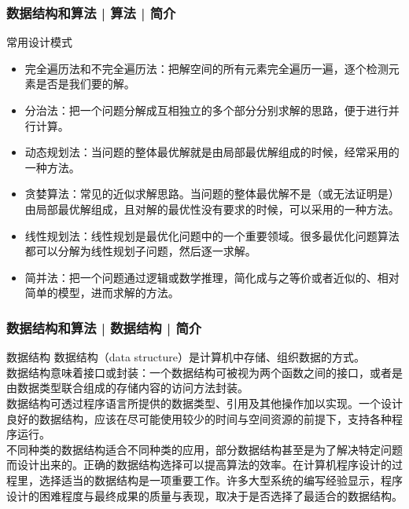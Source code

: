 \begin{frame}
  \frametitle{数据结构和算法 | 算法 | 简介}
  \begin{block}{常用设计模式}
    \begin{itemize}
      \item 完全遍历法和不完全遍历法：把解空间的所有元素完全遍历一遍，逐个检测元素是否是我们要的解。
      \item 分治法：把一个问题分解成互相独立的多个部分分别求解的思路，便于进行并行计算。
      \item 动态规划法：当问题的整体最优解就是由局部最优解组成的时候，经常采用的一种方法。
      \item 贪婪算法：常见的近似求解思路。当问题的整体最优解不是（或无法证明是）由局部最优解组成，且对解的最优性没有要求的时候，可以采用的一种方法。
      \item 线性规划法：线性规划是最优化问题中的一个重要领域。很多最优化问题算法都可以分解为线性规划子问题，然后逐一求解。
      \item 简并法：把一个问题通过逻辑或数学推理，简化成与之等价或者近似的、相对简单的模型，进而求解的方法。
    \end{itemize}
  \end{block}
\end{frame}

\begin{frame}
  \frametitle{数据结构和算法 | 数据结构 | 简介}
  \begin{block}{数据结构}
    数据结构（data structure）是计算机中存储、组织数据的方式。\\
    \vspace{0.5em}
数据结构意味着接口或封装：一个数据结构可被视为两个函数之间的接口，或者是由数据类型联合组成的存储内容的访问方法封装。\\
    \vspace{0.5em}
数据结构可透过程序语言所提供的数据类型、引用及其他操作加以实现。一个设计良好的数据结构，应该在尽可能使用较少的时间与空间资源的前提下，支持各种程序运行。\\
    \vspace{0.5em}
不同种类的数据结构适合不同种类的应用，部分数据结构甚至是为了解决特定问题而设计出来的。\alert{正确的数据结构选择可以提高算法的效率}。在计算机程序设计的过程里，选择适当的数据结构是一项重要工作。许多大型系统的编写经验显示，程序设计的困难程度与最终成果的质量与表现，取决于是否选择了最适合的数据结构。
  \end{block}
\end{frame}

